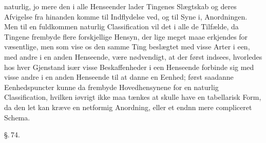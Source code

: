 \documentclass[12pt]{book}
\def\textit#1{#1}%
\def\emph#1{#1}%
\newcommand{\parag}[1]{%
  \par\vspace{0.9\baselineskip}%
  {\centering\textit{\S.\,#1.}\par}%
  \vspace{0.35\baselineskip}%
  \noindent\hspace{\parindent}\ignorespaces
}
\newcommand{\opage}[1]{\marginnote{\footnotesize\textit{[#1]}}}
\begin{document}
\emph{naturlig}, jo mere den i alle Henseender lader Tingenes Slægtskab og deres
Afvigelse fra hinanden komme til Indflydelse ved, og til Syne i, Anordningen. Men
til en
\opage{201} fuldkommen naturlig Classification vil det i alle de Tilfælde, da Tingene
frembyde flere forskjellige Hensyn, der lige meget maae erkjendes for væsentlige,
men som vise os den samme Ting beslægtet med visse Arter i een, med andre i en
anden Henseende, være nødvendigt, at der først indsees, hvorledes hos hver
Gjenstand især visse Beskaffenheder i een Henseende forbinde sig med visse andre
i en anden Henseende til at danne en Eenhed; først saadanne Eenhedspuncter kunne
da frembyde Hovedhensynene for en naturlig Classification, hvilken iøvrigt ikke
maa tænkes at skulle have en \emph{tabellarisk} Form, da den let kan kræve en
netformig Anordning, eller et endnn mere compliceret Schema.

\parag{74}
\end{document}
